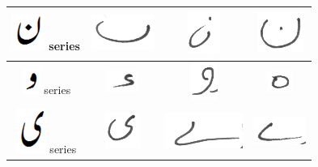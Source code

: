 \documentclass[a4paper,conference]{IEEEtran}
\begin{document}
\begin{table}[h]
\begin{tabular}{@{}cccc@{}}
\hline
\includegraphics[scale=0.15]{noon_orig} series & \includegraphics[scale=0.15]{noon_guna} & \includegraphics[scale=0.15]{noon} & 
\includegraphics[scale=0.15]{noon2} \\
\hline
\includegraphics[scale=0.15]{wao_orig} series & \includegraphics[scale=0.15]{capture} & \includegraphics[scale=0.15]{wao}  & 
\includegraphics[scale=0.15]{haaa} \\
\hline
\includegraphics[scale=0.15]{choti_ye_orig} series & \includegraphics[scale=0.15]{choti_yaa2} & \includegraphics[scale=0.15]{Bari_yaa2} & 
\includegraphics[scale=0.15]{bari_yaa} \\

 \end{tabular}
\end{table}
\end{document}
